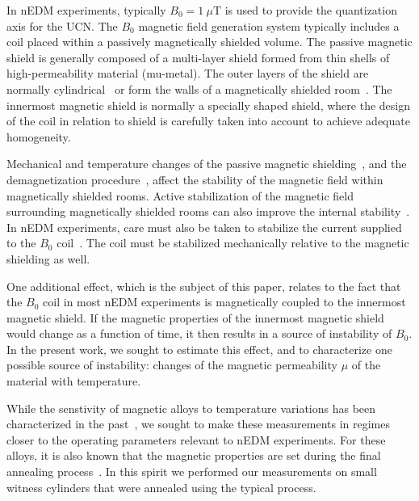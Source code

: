 \documentclass[review]{elsarticle}
\begin{document}
In nEDM experiments, typically $B_0=1~\mu$T is used to provide the
quantization axis for the UCN.  The $B_0$ magnetic field generation
system typically includes a coil placed within a passively
magnetically shielded volume.  The passive magnetic shield is
generally composed of a multi-layer shield formed from thin shells of
high-permeability material (mu-metal).  The outer layers of the shield
are normally cylindrical~\cite{bib:nedm3.5,bib:nedm2} or form the
walls of a magnetically shielded room~\cite{bib:altarev2014}.  The
innermost magnetic shield is normally a specially shaped shield, where
the design of the coil in relation to shield is carefully taken into
account to achieve adequate homogeneity.

Mechanical and temperature changes of the passive magnetic
shielding~\cite{bib:voigt,bib:thiel}, and the demagnetization
procedure~\cite{bib:thiel,bib:fierlinger2016}, affect the stability of
the magnetic field within magnetically shielded rooms.  Active
stabilization of the magnetic field surrounding magnetically shielded
rooms can also improve the internal
stability~\cite{bib:franke,bib:voigt,bib:afach}.  In nEDM experiments,
care must also be taken to stabilize the current supplied to the $B_0$
coil~\cite{bib:brys}. The coil must be stabilized mechanically
relative to the magnetic shielding as well.

One additional effect, which is the subject of this paper, relates to
the fact that the $B_0$ coil in most nEDM experiments is magnetically
coupled to the innermost magnetic shield.  If the magnetic properties
of the innermost magnetic shield would change as a function of time,
it then results in a source of instability of $B_0$.  In the present
work, we sought to estimate this effect, and to characterize one
possible source of instability: changes of the magnetic permeability
$\mu$ of the material with temperature.

While the senstivity of magnetic alloys to temperature variations has
been characterized in the past~\cite{bib:couderchon,bib:kruppvdm}, we
sought to make these measurements in regimes closer to the operating
parameters relevant to nEDM experiments.  For these alloys, it is also
known that the magnetic properties are set during the final annealing
process~\cite{bib:gupta,bib:bozorth,bib:kruppvdm}.  In this spirit we
performed our measurements on small witness cylinders that were
annealed using the typical process.




\end{document}
